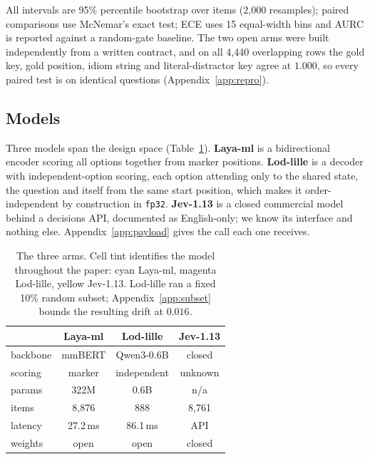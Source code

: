 \documentclass[11pt]{article}
\newcommand{\laya}[1]{\cellcolor{fLaya}#1}
\newcommand{\lod}[1]{\cellcolor{fLod}#1}
\newcommand{\jev}[1]{\cellcolor{fJev}#1}
\begin{document}
All intervals are 95\% percentile bootstrap over items (2{,}000 resamples);
paired comparisons use McNemar's exact test; ECE uses 15 equal-width bins and
AURC is reported against a random-gate baseline. The two open arms were built
independently from a written contract, and on all 4{,}440 overlapping rows the
gold key, gold position, idiom string and literal-distractor key agree at
$1.000$, so every paired test is on identical questions
(Appendix~\ref{app:repro}).

\subsection{Models}

Three models span the design space (Table~\ref{tab:models}).
\textbf{Laya-ml} is a bidirectional encoder scoring all options together from
marker positions. \textbf{Lod-lille} is a decoder with independent-option
scoring, each option attending only to the shared state, the question and itself
from the same start position, which makes it order-independent by construction
in \texttt{fp32}. \textbf{Jev-1.13} is a closed commercial model behind a
decisions API, documented as English-only; we know its interface and nothing
else. Appendix~\ref{app:payload} gives the call each one receives.

\begin{table}[t]
\centering\small
\setlength{\tabcolsep}{3.5pt}
\begin{tabular}{lccc}
\toprule
& \laya{\textbf{Laya-ml}} & \lod{\textbf{Lod-lille}} & \jev{\textbf{Jev-1.13}} \\
\midrule
backbone & \laya{mmBERT} & \lod{Qwen3-0.6B} & \jev{closed} \\
scoring & \laya{marker} & \lod{independent} & \jev{unknown} \\
params & \laya{322M} & \lod{0.6B} & \jev{n/a} \\
items & \laya{8{,}876} & \lod{888} & \jev{8{,}761} \\
latency & \laya{27.2\,ms} & \lod{86.1\,ms} & \jev{API} \\
weights & \laya{open} & \lod{open} & \jev{closed} \\
\bottomrule
\end{tabular}
\caption{The three arms. Cell tint identifies the model throughout the paper:
cyan Laya-ml, magenta Lod-lille, yellow Jev-1.13. Lod-lille ran a fixed 10\%
random subset; Appendix~\ref{app:subset} bounds the resulting drift at
$0.016$.}
\label{tab:models}
\end{table}
\end{document}
